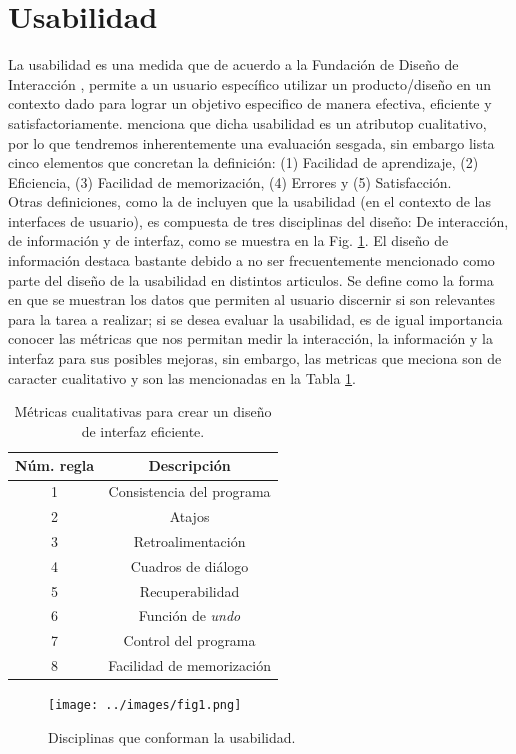 \section{Usabilidad}
La usabilidad es una medida que de acuerdo a la Fundación de Diseño de Interacción \cite{unknown-author-no-dateC}, %
permite a un usuario específico utilizar un producto/diseño en un contexto dado para lograr
un objetivo especifico de manera efectiva, eficiente y satisfactoriamente. \cite{unknown-author-no-dateB} menciona %
que dicha usabilidad es un atributop cualitativo, por lo que tendremos inherentemente una
evaluación sesgada, sin embargo lista cinco elementos que concretan la definición:
(1) Facilidad de aprendizaje, (2) Eficiencia, (3) Facilidad de memorización, (4) Errores 
y (5) Satisfacción.
\\

Otras definiciones, como la de \cite{guntupalli-no-date} %
incluyen que la usabilidad (en el contexto de las interfaces de usuario),
es compuesta de tres disciplinas del diseño: De interacción, de información y de 
interfaz, como se muestra en la Fig. \ref{fig:fig1}. El diseño de información destaca
bastante debido a no ser frecuentemente mencionado como parte del diseño de la usabilidad
en distintos articulos. Se define como la forma en que se muestran los datos que permiten 
al usuario discernir si son relevantes para la tarea a realizar; si se desea evaluar la usabilidad,
es de igual importancia conocer las métricas que nos permitan medir la interacción, la información
y la interfaz para sus posibles mejoras, sin embargo, las metricas que meciona son de caracter 
cualitativo y son las mencionadas en la Tabla \ref{tab1}.
\begin{table}[t]
    \caption{Métricas cualitativas para crear un diseño de interfaz eficiente.}
    \begin{center}
        \begin{tabular}{c c}
        \hline
        \textbf{Núm. regla} & \textbf{Descripción}\\
        \hline
        1 & Consistencia del programa\\
        2 & Atajos\\
        3 & Retroalimentación\\
        4 & Cuadros de diálogo\\
        5 & Recuperabilidad\\
        6 & Función de \emph{undo}\\
        7 & Control del programa\\
        8 & Facilidad de memorización\\
        \hline
        \end{tabular}
    \end{center}
    \label{tab1}
\end{table}
\begin{figure}[t]
    \centering
    \texttt{[image: ../images/fig1.png]}
    \caption{Disciplinas que conforman la usabilidad.}
    \label{fig:fig1}
\end{figure}
\\

